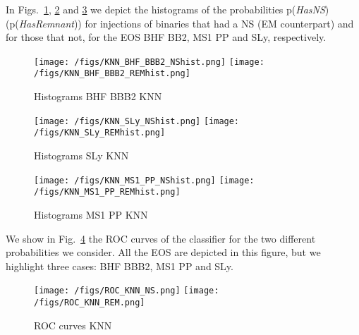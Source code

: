 


In Figs.~\ref{fig:KNN_hist_BHFBBB2}, \ref{fig:KNN_hist_SLY} and \ref{fig:KNN_hist_MS1PP}  we depict the histograms of the probabilities p(\textit{HasNS}) (p(\textit{HasRemnant})) for injections of binaries that had a NS (EM counterpart) and for those that not, for the EOS BHF BB2, MS1 PP and SLy, respectively.

\begin{figure}
\centering
\texttt{[image: /figs/KNN\_BHF\_BBB2\_NShist.png]}
\texttt{[image: /figs/KNN\_BHF\_BBB2\_REMhist.png]}
\caption{\label{fig:KNN_hist_BHFBBB2} Histograms BHF BBB2 KNN}
\end{figure}

\begin{figure}
\centering
\texttt{[image: /figs/KNN\_SLy\_NShist.png]}
\texttt{[image: /figs/KNN\_SLy\_REMhist.png]}
\caption{\label{fig:KNN_hist_SLY} Histograms SLy KNN}
\end{figure}

\begin{figure}
\centering
\texttt{[image: /figs/KNN\_MS1\_PP\_NShist.png]}
\texttt{[image: /figs/KNN\_MS1\_PP\_REMhist.png]}
\caption{\label{fig:KNN_hist_MS1PP} Histograms MS1 PP KNN}
\end{figure}

We show in Fig.~\ref{fig:KNN_roc} the ROC curves of the classifier for the two different probabilities we consider. All the EOS are depicted in this figure, but we highlight three cases: BHF BBB2, MS1 PP and SLy.

\begin{figure}
\centering
\texttt{[image: /figs/ROC\_KNN\_NS.png]}
\texttt{[image: /figs/ROC\_KNN\_REM.png]}
\caption{\label{fig:KNN_roc} ROC curves KNN}
\end{figure}




